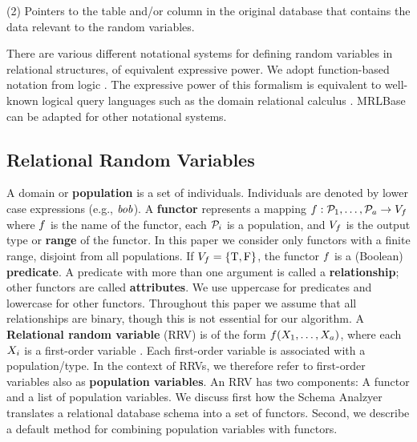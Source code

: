 \documentclass{acm_proc_article-sp}
\begin{document}
(2) Pointers to the table and/or column in the original database that contains the data relevant to the random variables. 


There are various different notational systems for defining random variables in relational structures, of equivalent expressive power. We adopt function-based notation from logic  \cite{Russell2010}. The expressive power of this formalism is equivalent to well-known logical query languages such as the domain relational calculus \cite{Ullman1982}. MRLBase can be adapted for other notational systems.

\subsection{Relational Random Variables}
A domain or \textbf{population} is a set of individuals.
Individuals are denoted by lower case expressions (e.g., $\it{bob}$). 
A \textbf{functor} represents a mapping
$f: \mathcal{P}_{1},\ldots,\mathcal{P}_{a} \rightarrow V_{f}$
where $f$ is the name of the functor, each $\mathcal{P}_{i}$ is a population, and $V_{f}$ is the output type or \textbf{range} of the functor. 
In this paper we consider only functors with a finite range, disjoint from all populations.  If $V_{f} = \{\mathrm{T},\mathrm{F}\}$, the functor $f$ is a (Boolean) \textbf{predicate}. A predicate with more than one argument is called a \textbf{relationship}; other functors are called \textbf{attributes}. We use uppercase for predicates and lowercase for other functors. Throughout this paper we assume that all relationships are binary, though this is not essential for our algorithm.
%
A \textbf{Relational random variable} (RRV) is of the form $f(X_{1},\ldots,X_{a})$, where each $X_{i}$ is a first-order variable \cite{Poole2003,Russell2010}. 
Each first-order variable is associated with a population/type. In the context of RRVs, we therefore refer to first-order variables also as \textbf{population variables}. An RRV has two components: A functor and a list of population variables. We discuss first how the Schema Analzyer translates a relational database schema into a set of functors. Second, we describe a default method for combining population variables with functors. 
\end{document}
